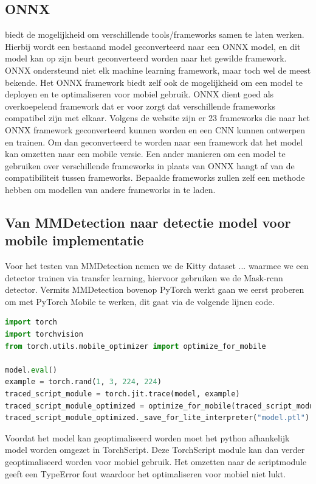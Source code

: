 \subsection{ONNX}
\cite{onnx_onnx_2017} biedt de mogelijkheid om verschillende tools/frameworks samen te laten werken.
Hierbij wordt een bestaand model geconverteerd naar een ONNX model, en dit model kan op zijn beurt geconverteerd worden naar het gewilde framework.
ONNX ondersteund niet elk machine learning framework, maar toch wel de meest bekende.
Het ONNX framework biedt zelf ook de mogelijkheid om een model te deployen en te optimaliseren voor mobiel gebruik.
ONNX dient goed als overkoepelend framework dat er voor zorgt dat verschillende frameworks compatibel zijn met elkaar.
Volgens de website zijn er 23 frameworks die naar het ONNX framework geconverteerd kunnen worden en een CNN kunnen ontwerpen en trainen. 
Om dan geconverteerd te worden naar een framework dat het model kan omzetten naar een mobile versie.
Een ander manieren om een model te gebruiken over verschillende frameworks in plaats van ONNX hangt af van de compatibiliteit tussen frameworks.
Bepaalde frameworks zullen zelf een methode hebben om modellen van andere frameworks in te laden.

\subsection{Van MMDetection naar detectie model voor mobile implementatie}
Voor het testen van MMDetection nemen we de Kitty dataset ... waarmee we een detector trainen via transfer learning, hiervoor gebruiken we de Mask-rcnn detector.
Vermits MMDetection bovenop PyTorch werkt gaan we eerst proberen om met PyTorch Mobile te werken, dit gaat via de volgende lijnen code.

\begin{lstlisting}[language=Python, caption=Converteren van MMDetection naar een PyTorch Mobile]
import torch
import torchvision
from torch.utils.mobile_optimizer import optimize_for_mobile

model.eval()
example = torch.rand(1, 3, 224, 224)
traced_script_module = torch.jit.trace(model, example)
traced_script_module_optimized = optimize_for_mobile(traced_script_module)
traced_script_module_optimized._save_for_lite_interpreter("model.ptl")
\end{lstlisting}

Voordat het model kan geoptimaliseerd worden moet het python afhankelijk model worden omgezet in TorchScript. 
Deze TorchScript module kan dan verder geoptimaliseerd worden voor mobiel gebruik.
Het omzetten naar de scriptmodule geeft een TypeError fout waardoor het optimaliseren voor mobiel niet lukt.

